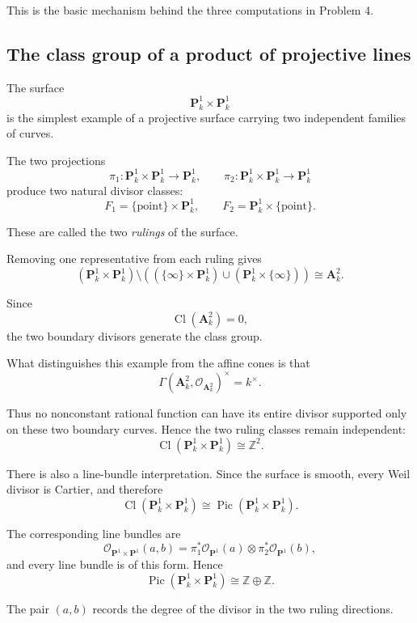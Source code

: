 This is the basic mechanism behind the three computations in Problem 4.

\subsection{The class group of a product of projective lines}

The surface
\[
\mathbf{P}^1_k\times \mathbf{P}^1_k
\]
is the simplest example of a projective surface carrying two independent families of curves.

The two projections
\[
\pi_1:\mathbf{P}^1_k\times\mathbf{P}^1_k\longrightarrow\mathbf{P}^1_k,
\qquad
\pi_2:\mathbf{P}^1_k\times\mathbf{P}^1_k\longrightarrow\mathbf{P}^1_k
\]
produce two natural divisor classes:
\[
F_1=\{\text{point}\}\times \mathbf{P}^1_k,
\qquad
F_2=\mathbf{P}^1_k\times\{\text{point}\}.
\]

These are called the two \emph{rulings} of the surface.

Removing one representative from each ruling gives
\[
(\mathbf{P}^1_k\times\mathbf{P}^1_k)
\setminus
\left(
(\{\infty\}\times\mathbf{P}^1_k)
\cup
(\mathbf{P}^1_k\times\{\infty\})
\right)
\cong
\mathbf{A}^2_k.
\]

Since
\[
\operatorname{Cl}(\mathbf{A}^2_k)=0,
\]
the two boundary divisors generate the class group.

What distinguishes this example from the affine cones is that
\[
\Gamma(\mathbf{A}^2_k,\mathcal{O}_{\mathbf{A}^2_k})^\times
=
k^\times.
\]

Thus no nonconstant rational function can have its entire divisor supported only on these two boundary curves. Hence the two ruling classes remain independent:
\[
\operatorname{Cl}(\mathbf{P}^1_k\times\mathbf{P}^1_k)\cong \mathbb{Z}^2.
\]

There is also a line-bundle interpretation. Since the surface is smooth, every Weil divisor is Cartier, and therefore
\[
\operatorname{Cl}(\mathbf{P}^1_k\times\mathbf{P}^1_k)
\cong
\operatorname{Pic}(\mathbf{P}^1_k\times\mathbf{P}^1_k).
\]

The corresponding line bundles are
\[
\mathcal{O}_{\mathbf{P}^1\times\mathbf{P}^1}(a,b)
=
\pi_1^*\mathcal{O}_{\mathbf{P}^1}(a)\otimes
\pi_2^*\mathcal{O}_{\mathbf{P}^1}(b),
\]
and every line bundle is of this form. Hence
\[
\operatorname{Pic}(\mathbf{P}^1_k\times\mathbf{P}^1_k)
\cong
\mathbb{Z}\oplus \mathbb{Z}.
\]

The pair \((a,b)\) records the degree of the divisor in the two ruling directions.

